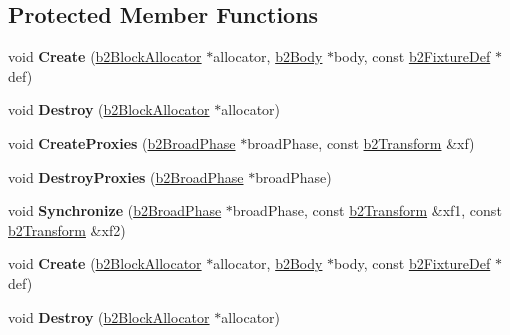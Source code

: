 \subsection*{Protected Member Functions}
\begin{DoxyCompactItemize}
\item 
\mbox{\label{classb2Fixture_a1f465f3656f098eebfcbc6edf7a9239a}} 
void {\bfseries Create} (\hyperlink{classb2BlockAllocator}{b2\+Block\+Allocator} $\ast$allocator, \hyperlink{classb2Body}{b2\+Body} $\ast$body, const \hyperlink{structb2FixtureDef}{b2\+Fixture\+Def} $\ast$def)
\item 
\mbox{\label{classb2Fixture_a279301181668f724c027020a654efe42}} 
void {\bfseries Destroy} (\hyperlink{classb2BlockAllocator}{b2\+Block\+Allocator} $\ast$allocator)
\item 
\mbox{\label{classb2Fixture_a670f1f687521666da6e92885754970b7}} 
void {\bfseries Create\+Proxies} (\hyperlink{classb2BroadPhase}{b2\+Broad\+Phase} $\ast$broad\+Phase, const \hyperlink{structb2Transform}{b2\+Transform} \&xf)
\item 
\mbox{\label{classb2Fixture_a1def068c9ce09e2ebcccc556951b7979}} 
void {\bfseries Destroy\+Proxies} (\hyperlink{classb2BroadPhase}{b2\+Broad\+Phase} $\ast$broad\+Phase)
\item 
\mbox{\label{classb2Fixture_ac8fd15bfd9a3a7ba05f3831e6f598908}} 
void {\bfseries Synchronize} (\hyperlink{classb2BroadPhase}{b2\+Broad\+Phase} $\ast$broad\+Phase, const \hyperlink{structb2Transform}{b2\+Transform} \&xf1, const \hyperlink{structb2Transform}{b2\+Transform} \&xf2)
\item 
\mbox{\label{classb2Fixture_a1f465f3656f098eebfcbc6edf7a9239a}} 
void {\bfseries Create} (\hyperlink{classb2BlockAllocator}{b2\+Block\+Allocator} $\ast$allocator, \hyperlink{classb2Body}{b2\+Body} $\ast$body, const \hyperlink{structb2FixtureDef}{b2\+Fixture\+Def} $\ast$def)
\item 
\mbox{\label{classb2Fixture_a279301181668f724c027020a654efe42}} 
void {\bfseries Destroy} (\hyperlink{classb2BlockAllocator}{b2\+Block\+Allocator} $\ast$allocator)
\item 

\end{DoxyCompactItemize}
